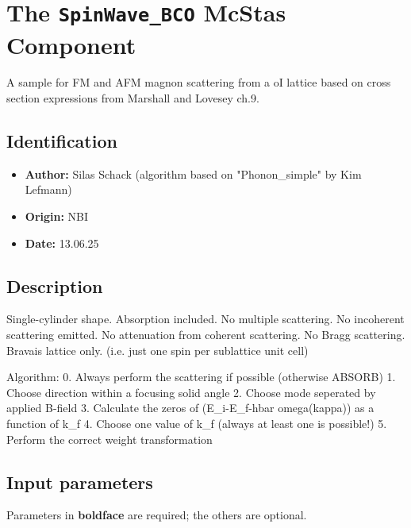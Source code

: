 \section{The \texttt{SpinWave\_BCO} McStas Component}
A sample for FM and AFM magnon scattering from a oI lattice based on cross section expressions from Marshall and Lovesey ch.9.

\subsection*{Identification}
\begin{itemize}
  \item \textbf{Author:} Silas Schack (algorithm based on "Phonon\_simple" by Kim Lefmann)
  \item \textbf{Origin:} NBI
  \item \textbf{Date:} 13.06.25
\end{itemize}

\subsection*{Description}
Single-cylinder shape. Absorption included. No multiple scattering. No incoherent scattering emitted. No attenuation from coherent scattering. No Bragg scattering. Bravais lattice only. (i.e. just one spin per sublattice unit cell)

Algorithm: 0. Always perform the scattering if possible (otherwise ABSORB) 1. Choose direction within a focusing solid angle 2. Choose mode seperated by applied B-field 3. Calculate the zeros of (E\_i-E\_f-hbar omega(kappa)) as a function of k\_f 4. Choose one value of k\_f (always at least one is possible!) 5. Perform the correct weight transformation

\subsection*{Input parameters}
Parameters in \textbf{boldface} are required; the others are optional.

